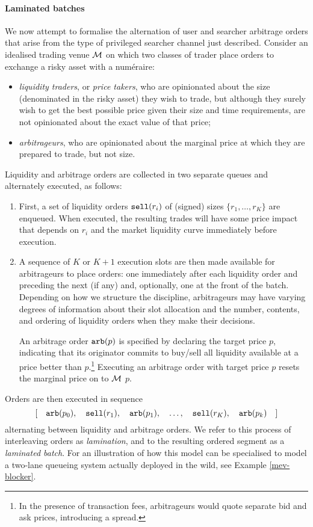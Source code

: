 \paragraph{Laminated batches}
We now attempt to formalise the alternation of user and searcher arbitrage orders that arise from the type of privileged searcher channel just described.
%
Consider an idealised trading venue $\mathcal{M}$ on which two classes of trader place orders to exchange a risky asset with a num\'eraire:
\begin{itemize}
  \item \emph{liquidity traders}, or \emph{price takers}, who are opinionated about the size (denominated in the risky asset) they wish to trade, but although they surely wish to get the best possible price given their size and time requirements, are not opinionated about the exact value of that price;
  \item \emph{arbitrageurs}, who are opinionated about the marginal price at which they are prepared to trade, but not size.
\end{itemize}
Liquidity and arbitrage orders are collected in two separate queues and alternately executed, as follows:
%
\begin{enumerate}
  \item 
    First, a set of liquidity orders $\mathtt{sell}(r_i)$ of (signed) sizes $\{r_1,\ldots,r_K\}$ are enqueued.
    When executed, the resulting trades will have some price impact that depends on $r_i$ and the market liquidity curve immediately before execution.
  
  \item
    A sequence of $K$ or $K+1$ execution slots are then made available for arbitrageurs to place orders: one immediately after each liquidity order and preceding the next (if any) and, optionally, one at the front of the batch.
    Depending on how we structure the discipline, arbitrageurs may have varying degrees of information about their slot allocation and the number, contents, and ordering of liquidity orders when they make their decisions.

    An arbitrage order $\mathtt{arb}(p)$ is specified by declaring the target price $p$, indicating that its originator commits to buy/sell all liquidity available at a price better than $p$.\footnote{In the presence of transaction fees, arbitrageurs would quote separate bid and ask prices, introducing a spread.}
    Executing an arbitrage order with target price $p$ resets the marginal price on to $\mathcal{M}$ $p$.

\end{enumerate}
Orders are then executed in sequence
\[
 [\quad \mathtt{arb}(p_0),\quad \mathtt{sell}(r_1),\quad \mathtt{arb}(p_1),\quad \ldots,\quad \mathtt{sell}(r_K),\quad \mathtt{arb}(p_k) \quad]
\]
alternating between liquidity and arbitrage orders.
%
We refer to this process of interleaving orders as \emph{lamination}, and to the resulting ordered segment as a \emph{laminated batch}.
%
For an illustration of how this model can be specialised to model a two-lane queueing system actually deployed in the wild, see Example \ref{mev-blocker}.


